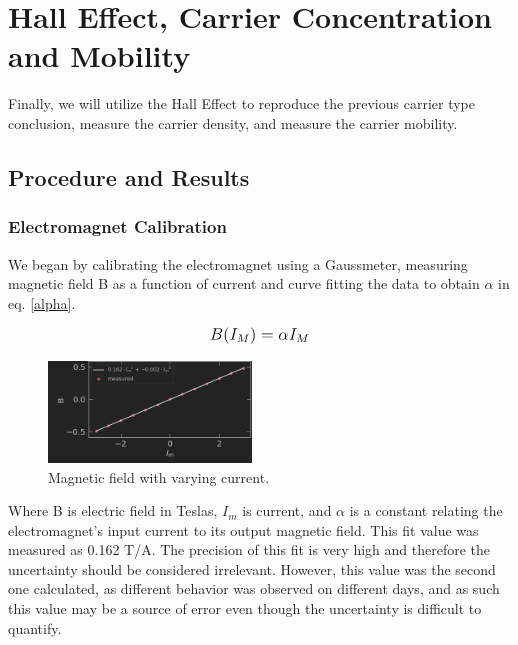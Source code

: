 \documentclass[aps,prl,reprint]{revtex4-2}
\begin{document}
\section{Hall Effect, Carrier Concentration and Mobility}

Finally, we will utilize the Hall Effect to reproduce the previous carrier type conclusion, 
measure the carrier density, and measure the carrier mobility. 

\subsection{Procedure and Results}

\subsubsection{Electromagnet Calibration}

We began by calibrating the electromagnet using a Gaussmeter, measuring magnetic field B as
a function of current and curve fitting the data to obtain $\alpha$ in eq. \ref{alpha}.

\begin{equation}
	\mathlarger{B(I_M) = \alpha I_M}
    \label{alpha}
\end{equation}

\begin{figure}[h]
	\begin{center}
		\includegraphics[width=0.48\textwidth]{../Images/l2_d_4.png}
	\end{center}
	\caption{\label{current} Magnetic field with varying current.}
\end{figure}

Where B is electric field in Teslas, $I_m$ is current, and $\alpha$ is a constant relating
the electromagnet's input current to its output magnetic field. This fit value was measured as
0.162 T/A. The precision of this fit is very high and therefore the uncertainty should be
considered irrelevant. However, this value was the second one calculated, as different
behavior was observed on different days, and as such this value may be a source of error even
though the uncertainty is difficult to quantify. \\
\end{document}
